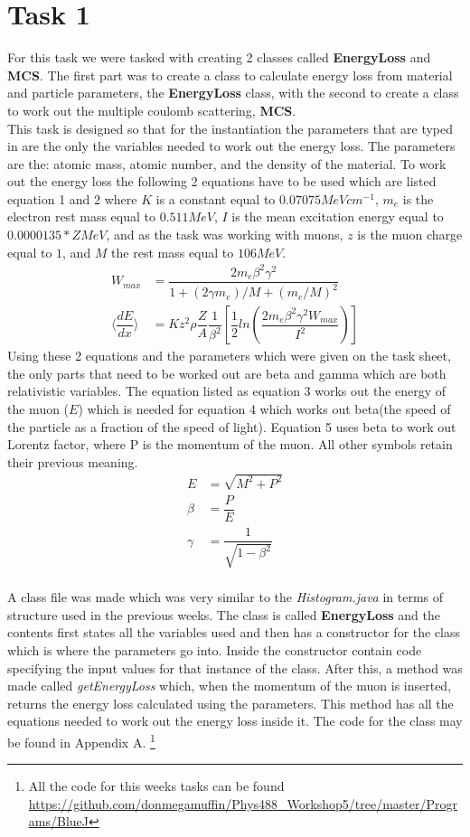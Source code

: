\documentclass[twocolumn]{article}
\begin{document}
\section{Task 1}
For this task we were tasked with creating 2 classes called \textbf{EnergyLoss} and \textbf{MCS}. The first part was to create a class to calculate energy loss from material and particle parameters, the \textbf{EnergyLoss} class, with the second to create a class to work out the multiple coulomb scattering, \textbf{MCS}.\\\indent This task is designed so that for the instantiation the parameters that are typed in are the only the variables needed to work out the energy loss. The parameters are the: atomic mass, atomic number, and the density of the material. To work out the energy loss the following 2 equations have to be used which are listed equation 1 and 2 where $K$ is a constant equal to $0.07075 MeVcm^{-1}$, $m_{e}$ is the electron rest mass equal to $0.511 MeV$, $I$ is the mean excitation energy equal to $0.0000135*Z MeV$, and as the task was working with muons, $z$ is the muon charge equal to $1$, and $M$ the rest mass equal to $106 MeV$.
	\begin{align}
	W_{max}&=\dfrac{2m_e \beta^2 \gamma^2}{1+(2 \gamma m_e)/M+(m_e/M)^2}     \\
	\langle\dfrac{dE}{dx}\rangle &= Kz^2 \rho \dfrac{Z}{A}  \dfrac{1}{\beta^2} [\dfrac{1}{2} ln(\dfrac{2m_e \beta^2 \gamma^2 W_{max}}{I^2})] 
	\end{align}
Using these 2 equations and the parameters which were given on the task sheet, the only parts that need to be worked out are beta and gamma which are both relativistic variables. The equation listed as equation 3 works out the energy of the muon ($E$) which is needed for equation 4 which works out beta(the speed of the particle as a fraction of the speed of light). Equation 5 uses beta to work out Lorentz factor, where P is the momentum of the muon. All other symbols retain their previous meaning.
	\begin{align}
	E &= \sqrt{M^2 + P^2} \\
	\beta &= \dfrac{P}{E} \\
	\gamma &= \dfrac{1}{\sqrt{1-\beta^2}}
	\end{align}
\\ \indent A class file was made which was very similar to the \textit{Histogram.java} in terms of structure used in the previous weeks. The class is called \textbf{EnergyLoss} and the contents first states all the variables used and then has a constructor for the class which is where the parameters go into. Inside the constructor contain code specifying the input values for that instance of the class. After this, a method was made called \textit{getEnergyLoss} which, when the momentum of the muon is inserted, returns the energy loss calculated using the parameters. This method has all the equations needed to work out the energy loss inside it. The code for the class may be found in Appendix A. \footnote[1]{All the code for this weeks tasks can be found \url{https://github.com/donmegamuffin/Phys488_Workshop5/tree/master/Programs/BlueJ}}
\end{document}
